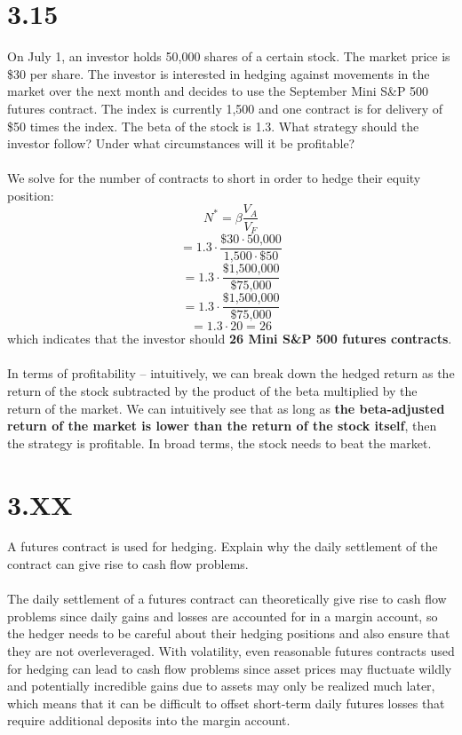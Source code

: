\documentclass{article}
\begin{document}
{\Large 

\section*{3.15}

On July 1, an investor holds 50,000 shares of a certain stock. The market price is \$30 per share. The investor is interested in hedging against movements in the market over the next month and decides to use the September Mini S\&P 500 futures contract. The index is currently 1,500 and one contract is for delivery of \$50 times the index. The beta of the stock is 1.3. What strategy should the investor follow? Under what circumstances will it be profitable? \\ \\
We solve for the number of contracts to short in order to hedge their equity position: 
\[
  N^* = \beta \frac{V_A}{V_F}
\]
\[
  = 1.3 \cdot \frac{\$30 \cdot \text{50,000}}{\text{1,500} \cdot \$50}
\]
\[
  = 1.3 \cdot \frac{\text{\$1,500,000}}{\text{\$75,000}}
\]
\[
  = 1.3 \cdot \frac{\text{\$1,500,000}}{\text{\$75,000}}
\]
\[
  = 1.3 \cdot 20 = 26
\]
which indicates that the investor should \textbf{26 Mini S\&P 500 futures contracts}. \\ \\
In terms of profitability -- intuitively, we can break down the hedged return as the return of the stock subtracted by the product of the beta multiplied by the return of the market. We can intuitively see that as long as \textbf{the beta-adjusted return of the market is lower than the return of the stock itself}, then the strategy is profitable. In broad terms, the stock needs to beat the market.

}
{\Large 

\section*{3.XX}

A futures contract is used for hedging. Explain why the daily settlement of the contract can give rise to cash flow problems. \\ \\
The daily settlement of a futures contract can theoretically give rise to cash flow problems since daily gains and losses are accounted for in a margin account, so the hedger needs to be careful about their hedging positions and also ensure that they are not overleveraged. With volatility, even reasonable futures contracts used for hedging can lead to cash flow problems since asset prices may fluctuate wildly and potentially incredible gains due to assets may only be realized much later, which means that it can be difficult to offset short-term daily futures losses that require additional deposits into the margin account.

}
\end{document}
